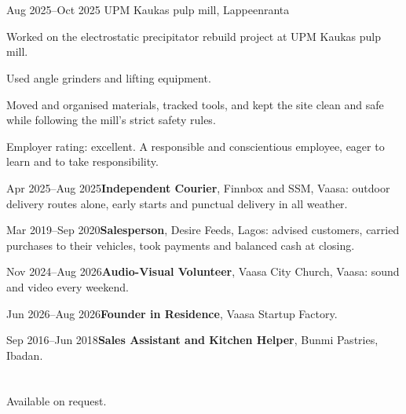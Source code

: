 \documentclass[a4paper,11pt]{article}
\begin{document}
\section{}
\begin{cventry}{Aug 2025--Oct 2025}{}
  UPM Kaukas pulp mill, Lappeenranta\par
  Worked on the electrostatic precipitator rebuild project at UPM Kaukas pulp mill.\par
  Used angle grinders and lifting equipment.\par
  Moved and organised materials, tracked tools, and kept the site clean and safe while following the mill's strict safety rules.\par
  Employer rating: excellent. A responsible and conscientious employee, eager to learn and to take responsibility.
\end{cventry}
\begin{cventry}{Apr 2025--Aug 2025}{\textbf{Independent Courier}, Finnbox and SSM, Vaasa: outdoor delivery routes alone, early starts and punctual delivery in all weather.}
\end{cventry}
\begin{cventry}{Mar 2019--Sep 2020}{\textbf{Salesperson}, Desire Feeds, Lagos: advised customers, carried purchases to their vehicles, took payments and balanced cash at closing.}
\end{cventry}
\begin{cventry}{Nov 2024--Aug 2026}{\textbf{Audio-Visual Volunteer}, Vaasa City Church, Vaasa: sound and video every weekend.}
\end{cventry}
\begin{cventry}{Jun 2026--Aug 2026}{\textbf{Founder in Residence}, Vaasa Startup Factory.}
\end{cventry}
\begin{cventry}{Sep 2016--Jun 2018}{\textbf{Sales Assistant and Kitchen Helper}, Bunmi Pastries, Ibadan.}
\end{cventry}

\section{}

\section{}
Available on request.
\end{document}
